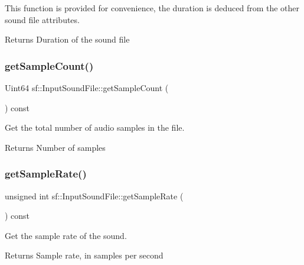 This function is provided for convenience, the duration is deduced from the other sound file attributes.

\begin{DoxyReturn}{Returns}
Duration of the sound file 
\end{DoxyReturn}
\mbox{\label{classsf_1_1_input_sound_file_a665b7fed6cdca3e0c622909e5a6655e4}} 
\subsubsection{\texorpdfstring{get\+Sample\+Count()}{getSampleCount()}}
{\footnotesize\ttfamily Uint64 sf\+::\+Input\+Sound\+File\+::get\+Sample\+Count (\begin{DoxyParamCaption}{ }\end{DoxyParamCaption}) const}



Get the total number of audio samples in the file. 

\begin{DoxyReturn}{Returns}
Number of samples 
\end{DoxyReturn}
\mbox{\label{classsf_1_1_input_sound_file_a6b8177e40dd8020752f6d52f96b774c3}} 
\subsubsection{\texorpdfstring{get\+Sample\+Rate()}{getSampleRate()}}
{\footnotesize\ttfamily unsigned int sf\+::\+Input\+Sound\+File\+::get\+Sample\+Rate (\begin{DoxyParamCaption}{ }\end{DoxyParamCaption}) const}



Get the sample rate of the sound. 

\begin{DoxyReturn}{Returns}
Sample rate, in samples per second 
\end{DoxyReturn}
\mbox{\label{classsf_1_1_input_sound_file_a84f32fdf5fa619538506395c3c5a030a}} 

